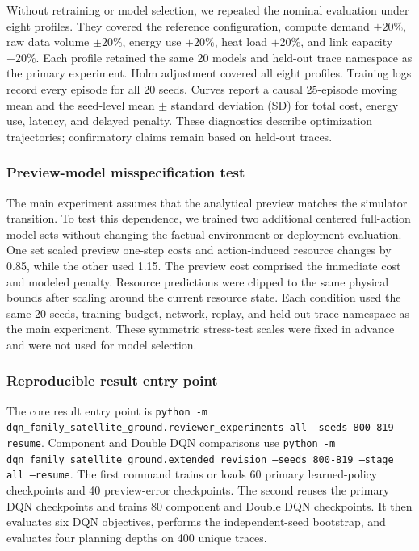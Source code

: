 \documentclass[remotesensing,article,submit,moreauthors]{Definitions/mdpi}
\begin{document}
Without retraining or model selection, we repeated the nominal evaluation under eight profiles. They covered the reference configuration, compute demand $\pm20\%$, raw data volume $\pm20\%$, energy use $+20\%$, heat load $+20\%$, and link capacity $-20\%$. Each profile retained the same 20 models and held-out trace namespace as the primary experiment. Holm adjustment covered all eight profiles. Training logs record every episode for all 20 seeds. Curves report a causal 25-episode moving mean and the seed-level mean $\pm$ standard deviation (SD) for total cost, energy use, latency, and delayed penalty. These diagnostics describe optimization trajectories; confirmatory claims remain based on held-out traces.

\subsubsection{Preview-model misspecification test}

The main experiment assumes that the analytical preview matches the simulator transition. To test this dependence, we trained two additional centered full-action model sets without changing the factual environment or deployment evaluation. One set scaled preview one-step costs and action-induced resource changes by 0.85, while the other used 1.15. The preview cost comprised the immediate cost and modeled penalty. Resource predictions were clipped to the same physical bounds after scaling around the current resource state. Each condition used the same 20 seeds, training budget, network, replay, and held-out trace namespace as the main experiment. These symmetric stress-test scales were fixed in advance and were not used for model selection.

\subsubsection{Reproducible result entry point}

The core result entry point is \texttt{python -m dqn\_family\_satellite\_ground.\allowbreak reviewer\_experiments all \allowbreak --seeds 800-819 \allowbreak --resume}. Component and Double DQN comparisons use \texttt{python -m dqn\_family\_satellite\_ground.\allowbreak extended\_revision \allowbreak --seeds 800-819 \allowbreak --stage all \allowbreak --resume}. The first command trains or loads 60 primary learned-policy checkpoints and 40 preview-error checkpoints. The second reuses the primary DQN checkpoints and trains 80 component and Double DQN checkpoints. It then evaluates six DQN objectives, performs the independent-seed bootstrap, and evaluates four planning depths on 400 unique traces.
\end{document}
